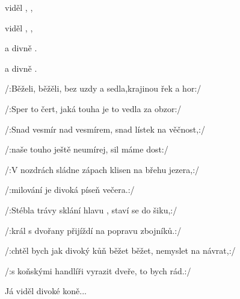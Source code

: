 

\zs
{} viděl  ,  , 

 viděl  ,  , 

   a divně  . 

   a divně  . 
\ks

\zs
/:Běželi, běžěli, bez uzdy a sedla,krajinou řek a hor:/

/:Sper to čert, jaká touha je to vedla za obzor:/
\ks

\zs
/:Snad vesmír nad vesmírem, snad lístek na věčnost,:/

/:naše touho ještě neumírej, sil máme dost:/
\ks

\zs
/:V nozdrách sládne zápach klisen na břehu jezera,:/

/:milování je divoká píseň večera.:/
\ks

\zs
/:Stébla trávy sklání hlavu , staví se do šiku,:/

/:král s dvořany přijíždí na popravu zbojníků.:/
\ks

\zs
/:chtěl bych jak divoký kůň běžet běžet, nemyslet na návrat,:/

/:s koňskými handlíři vyrazit dveře, to bych rád.:/



Já viděl divoké koně... 
\ks
\kp

